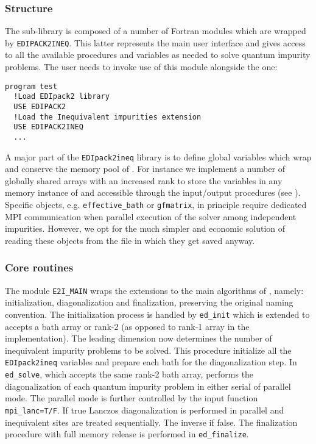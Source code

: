 \documentclass[edipack2.tex]{subfiles}
\begin{document}
\subsubsection{Structure}\label{ssSecIneqStructure}
The sub-library is composed of a number of Fortran modules which are
wrapped by {\tt EDIPACK2INEQ}. This latter represents the main user
interface and gives access to all the available procedures and
variables as needed to solve quantum impurity problems.
The user needs to invoke use of this module alongside the \NAME one:
\begin{lstlisting}[style=fstyle,numbers=none,basicstyle={\scriptsize\ttfamily}]
program test
  !Load EDIpack2 library 
  USE EDIPACK2 
  !Load the Inequivalent impurities extension
  USE EDIPACK2INEQ
  ...
\end{lstlisting}


A major part of the {\tt EDIpack2ineq} library is to define global
variables which wrap and conserve the memory pool of \NAME.
For instance we implement a number of
globally shared arrays with an increased rank to store the
variables in any memory instance of \NAME and accessible through
the input/output procedures (see ).
Specific objects, e.g. {\tt effective\_bath} or {\tt gfmatrix}, in
principle require dedicated MPI
communication when parallel execution of the solver among independent
impurities. However, we opt for the much simpler and economic solution
of reading these objects from the file in which they get saved
anyway. 


\subsubsection{Core routines}\label{ssSecIneqGlobal}
The module {\tt E2I\_MAIN} wraps the extensions to the main algorithms
of \NAME, namely: initialization, diagonalization and finalization,
preserving the original naming convention.  
The initialization process is handled by {\tt ed\_init} which is
extended to accepts a bath array or rank-2 (as opposed to rank-1 array
in the \NAME implementation). The leading dimension now determines the
number of inequivalent impurity problems to be solved. This procedure
initialize all the {\tt EDIpack2ineq} variables and prepare each bath
for the diagonalization step. 
In {\tt ed\_solve}, which accepts the same rank-2 bath array, performs the
diagonalization of each quantum impurity problem in either serial of
parallel mode. The parallel mode is further controlled by the input
function {\tt mpi\_lanc=T/F}. If true Lanczos diagonalization is
performed in parallel and inequivalent sites are treated
sequentially. The inverse if false.   
The finalization procedure with full memory release is performed in
{\tt ed\_finalize}.
\end{document}
